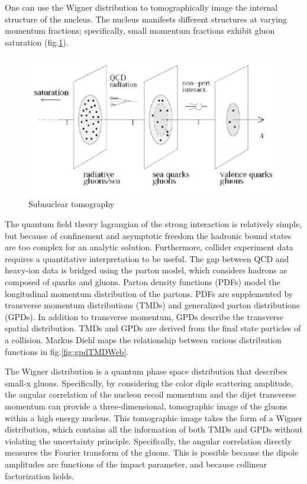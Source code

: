 One can use the Wigner distribution to tomographically image the internal structure of the nucleus. The nucleus manifests different structures at varying momentum fractions; specifically, small momentum fractions exhibit gluon saturation (fig.\ref{fig:nuclImag}).

\begin{figure}[h!]
\begin{centering}
\includegraphics[width=7in]{Chapter2/importfigs/imaging_the_nucleon_upc_dijets_pres.png}
\par\end{centering}
\caption{Subnuclear tomography \label{fig:nuclImag}}
\end{figure}

The quantum field theory lagrangian of the strong interaction is relatively simple, but because of confinement and asymptotic freedom the hadronic bound states are too complex for an analytic solution. Furthermore, collider experiment data requires a quantitative interpretation to be useful. The gap between QCD and heavy-ion data is bridged using the parton model, which considers hadrons as composed of quarks and gluons. Parton density functions (PDFs) model the longitudinal momentum distribution of the partons. PDFs are supplemented by transverse momentum distributions (TMDs) and generalized parton distributions (GPDs). In addition to transverse momentum, GPDs describe the transverse spatial distribution. TMDs and GPDs are derived from the final state particles of a collision. Markus Diehl maps the relationship between various distribution functions in fig.\ref{fig:gpdTMDWeb}.

The Wigner distribution is a quantum phase space distribution that describes small-x gluons. Specifically, by considering the color diple scattering amplitude, the angular correlation of the nucleon recoil momentum and the dijet transverse momentum can provide a three-dimensional, tomographic image of the gluons within a high energy nucleus. This tomographic image takes the form of a Wigner distribution, which contains all the information of both TMDs and GPDs without violating the uncertainty principle. Specifically, the angular correlation directly measures the Fourier transform of the gluons. This is possible because the dipole amplitudes are functions of the impact parameter, and because collinear factorization holds. 

